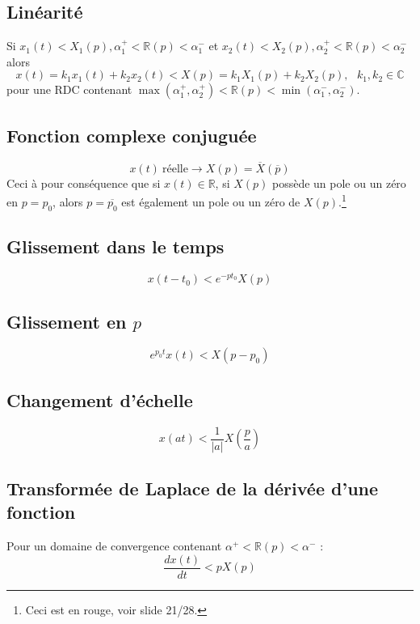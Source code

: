 \subsection{Linéarité}
Si $x_1(t) \lt X_1(p), \alpha_1^+ < \mathbb{R}(p) < \alpha_1^-$ et $x_2(t) \lt X_2(p),
\alpha_2^+ < \mathbb{R}(p) < \alpha_2^-$ alors 
\begin{equation}
	x(t) = k_1x_1(t) + k_2x_2(t) \lt X(p) = k_1X_1(p) + k_2X_2(p),\ \ \ k_1,k_2\in\mathbb{C}
\end{equation}
pour une RDC contenant $\max(\alpha_1^+,\alpha_2^+)< \mathbb{R}(p) < \min(\alpha^-_1,\alpha^-_2)$.
	
	
\subsection{Fonction complexe conjuguée}
\begin{equation}
	x(t)\ \text{réelle} \rightarrow X(p) = \overline{X}(\overline{p})
\end{equation}
Ceci à pour conséquence que si $x(t) \in \mathbb{R}$, si $X(p)$ possède un pole ou un 
zéro en $p=p_0$, alors $p=\overline{p_0}$ est également un pole ou un zéro de $X(p)$.\footnote{
Ceci est en rouge, voir slide 21/28.}
	
	
\subsection{Glissement dans le temps}	
\begin{equation}
	x(t-t_0) \lt e^{-pt_0}X(p)
\end{equation}
	
	
\subsection{Glissement en $p$}
\begin{equation}
	e^{p_0t}x(t) \lt X(p-p_0)
\end{equation}
	
	
	
\subsection{Changement d'échelle}
\begin{equation}
	x(at) \lt \frac{1}{|a|}X\left(\frac{p}{a}\right)
\end{equation}
	
	
\subsection{Transformée de Laplace de la dérivée d'une fonction}
Pour un domaine de convergence contenant $\alpha^+<\mathbb{R}(p)<\alpha^-$ :
\begin{equation}
	\frac{dx(t)}{dt} \lt pX(p)
\end{equation}
	
